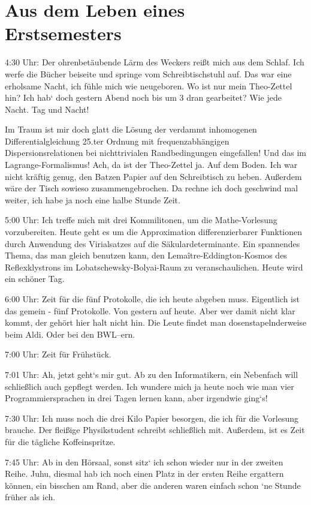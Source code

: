 \section{Aus dem Leben eines Erstsemesters}

4:30 Uhr: Der ohrenbetäubende Lärm des Weckers reißt mich aus dem Schlaf. Ich werfe die Bücher beiseite und springe vom
Schreibtischstuhl auf. Das war eine erholsame Nacht, ich fühle mich wie neugeboren. Wo ist nur mein Theo-Zettel hin? Ich hab` doch gestern Abend noch bis um 3 dran gearbeitet? Wie jede Nacht. Tag und Nacht!

Im Traum ist mir doch glatt die Lösung der verdammt inhomogenen Differentialgleichung 25.ter Ordnung mit frequenzabhängigen Dispersionsrelationen bei nichttrivialen Randbedingungen eingefallen! Und das im Lagrange-Formalismus! Ach, da ist der Theo-Zettel ja. Auf dem Boden. Ich war nicht kräftig genug, den Batzen Papier auf den Schreibtisch zu heben. Außerdem wäre der Tisch sowieso zusammengebrochen. Da rechne ich doch geschwind mal weiter, ich habe ja noch eine halbe Stunde Zeit.

5:00 Uhr: Ich treffe mich mit drei Kommilitonen, um die
Mathe-Vorlesung vorzubereiten. Heute geht es um die Approximation differenzierbarer Funktionen durch Anwendung des Virialsatzes auf die Säkulardeterminante. Ein spannendes Thema, das man gleich benutzen kann, den Lemaître-Eddington-Kosmos des Reflexklystrons im Lobatschewsky-Bolyai-Raum zu veranschaulichen. Heute wird ein schöner Tag.

6:00 Uhr: Zeit für die fünf Protokolle, die ich heute abgeben muss. Eigentlich ist das gemein - fünf Protokolle. Von gestern auf heute. Aber wer damit nicht klar kommt, der gehört hier halt nicht hin. Die Leute findet man dosenstapelnderweise beim Aldi. Oder bei den BWL--ern.

7:00 Uhr: Zeit für Frühstück.

7:01 Uhr: Ah, jetzt geht`s mir gut. Ab zu den Informatikern, ein Nebenfach will schließlich auch gepflegt werden. Ich wundere mich ja heute noch wie man vier Programmiersprachen in drei Tagen lernen kann, aber irgendwie ging`s!

7:30 Uhr: Ich muss noch die drei Kilo Papier besorgen, die ich für die Vorlesung brauche. Der fleißige Physikstudent schreibt
schließlich mit. Außerdem, ist es Zeit für die tägliche
Koffeinspritze.

7:45 Uhr: Ab in den Hörsaal, sonst sitz` ich schon wieder nur in der zweiten Reihe. Juhu, diesmal hab ich noch einen Platz in der ersten Reihe ergattern können, ein bisschen am Rand, aber die anderen waren einfach schon `ne Stunde früher als ich.

